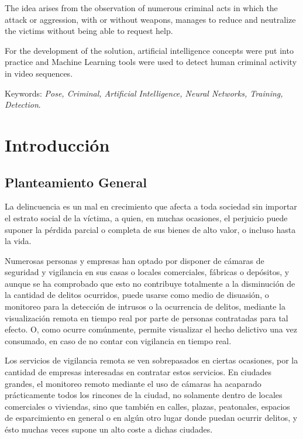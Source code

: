 \documentclass[a4paper,12pt,oneside,spanish]{book}
\begin{document}
The idea arises from the observation of numerous criminal acts in which the attack or aggression, with or without weapons, manages to reduce and neutralize the victims without being able to request help.\par

For the development of the solution, artificial intelligence concepts were put into practice and Machine Learning tools were used to detect human criminal activity in video sequences.\par

Keywords: \textit {Pose, Criminal, Artificial Intelligence, Neural Networks, Training, Detection}.

\newpage
\setlength{\parskip}{0.8em}
\chapter{Introducción} 
\section{Planteamiento General}
La delincuencia es un mal en crecimiento que afecta a toda sociedad sin importar el estrato social de la víctima, a quien, en muchas ocasiones, el perjuicio puede suponer la pérdida parcial o completa de sus bienes de alto valor, o incluso hasta la vida.\par 
 
Numerosas personas y empresas han optado por disponer de cámaras de seguridad y vigilancia en sus casas o locales comerciales, fábricas o depósitos, y aunque se ha comprobado que esto no contribuye totalmente a la disminución de la cantidad de delitos ocurridos, puede usarse como medio de disuasión, o monitoreo para la detección de intrusos o la ocurrencia de delitos, mediante la visualización remota en tiempo real por parte de personas contratadas para tal efecto. O, como ocurre comúnmente, permite visualizar el hecho delictivo una vez consumado, en caso de no contar con vigilancia en tiempo real.\par 

Los servicios de vigilancia remota se ven sobrepasados en ciertas ocasiones, por la cantidad de empresas interesadas en contratar estos servicios. En ciudades grandes, el monitoreo remoto mediante el uso de cámaras ha acaparado prácticamente todos los rincones de la ciudad, no solamente dentro de locales comerciales o viviendas, sino que también en calles, plazas, peatonales, espacios de esparcimiento en general o en algún otro lugar donde puedan ocurrir delitos, y ésto muchas veces supone un alto coste a dichas ciudades.\par 
\end{document}
